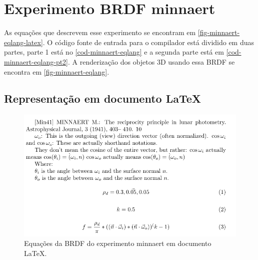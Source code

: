 \section{Experimento BRDF minnaert}

As equações que descrevem esse experimento se encontram em \autoref{fig-minnaert-eqlang-latex}. O código fonte de entrada para o compilador está dividido em duas partes, parte 1 está no \autoref{cod-minnaert-eqlang} e a segunda parte está em \autoref{cod-minnaert-eqlang-pt2}. A renderização dos objetos 3D usando essa BRDF se encontra em \autoref{fig-minnaert-eqlang}.

\subsection{Representação em documento \LaTeX{}}
\begin{figure}[H]
    \caption{\label{fig-minnaert-eqlang-latex} \small Equações da BRDF do experimento minnaert em documento \LaTeX{}.}
    \begin{center}
        \includegraphics[scale=0.92]{./Imagens/brdfs/minnaert.pdf}
    \end{center}
\end{figure}

